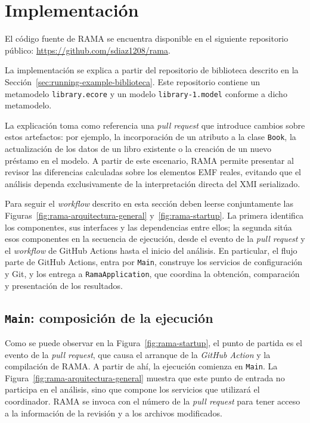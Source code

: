 \documentclass[11pt]{article}
\begin{document}
\newpage

\section{Implementación}
\label{sec:implementacion}

El código fuente de RAMA se encuentra disponible en el siguiente repositorio público: \url{https://github.com/sdiaz1208/rama}.

La implementación se explica a partir del repositorio de biblioteca descrito en la Sección~\ref{sec:running-example-biblioteca}. Este repositorio contiene un metamodelo \texttt{library.ecore} y un modelo \texttt{library-1.model} conforme a dicho metamodelo.

La explicación toma como referencia una \textit{pull request} que introduce cambios sobre estos artefactos: por ejemplo, la incorporación de un atributo a la clase \texttt{Book}, la actualización de los datos de un libro existente o la creación de un nuevo préstamo en el modelo. A partir de este escenario, RAMA permite presentar al revisor las diferencias calculadas sobre los elementos EMF reales, evitando que el análisis dependa exclusivamente de la interpretación directa del XMI serializado.

Para seguir el \textit{workflow} descrito en esta sección deben leerse conjuntamente las Figuras~\ref{fig:rama-arquitectura-general} y~\ref{fig:rama-startup}. La primera identifica los componentes, sus interfaces y las dependencias entre ellos; la segunda sitúa esos componentes en la secuencia de ejecución, desde el evento de la \textit{pull request} y el \textit{workflow} de GitHub Actions hasta el inicio del análisis. En particular, el flujo parte de GitHub Actions, entra por \texttt{Main}, construye los servicios de configuración y Git, y los entrega a \texttt{RamaApplication}, que coordina la obtención, comparación y presentación de los resultados.

\subsection{\texttt{Main}: composición de la ejecución}

Como se puede observar en la Figura~\ref{fig:rama-startup}, el punto de partida es el evento de la \textit{pull request}, que causa el arranque de la \textit{GitHub Action} y la compilación de RAMA. A partir de ahí, la ejecución comienza en \texttt{Main}. La Figura~\ref{fig:rama-arquitectura-general} muestra que este punto de entrada no participa en el análisis, sino que compone los servicios que utilizará el coordinador. RAMA se invoca con el número de la \textit{pull request} para tener acceso a la información de la revisión y a los archivos modificados.
\end{document}

